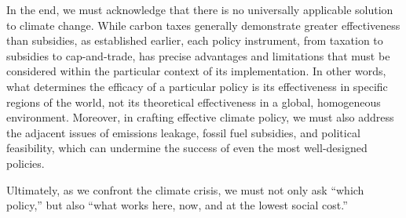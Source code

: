 \documentclass[12pt, a4paper, twoside]{article}
\begin{document}
In the end, we must acknowledge that there is no universally applicable solution to climate change. While carbon taxes generally demonstrate greater effectiveness than subsidies, as established earlier, each policy instrument, from taxation to subsidies to cap-and-trade, has precise advantages and limitations that must be considered within the particular context of its implementation. In other words, what determines the efficacy of a particular policy is its effectiveness in specific regions of the world, not its theoretical effectiveness in a global, homogeneous environment. Moreover, in crafting effective climate policy, we must also address the adjacent issues of emissions leakage, fossil fuel subsidies, and political feasibility, which can undermine the success of even the most well-designed policies. 

Ultimately, as we confront the climate crisis, we must not only ask “which policy,” but also “what works here, now, and at the lowest social cost.” 

\printbibliography
\end{document}
